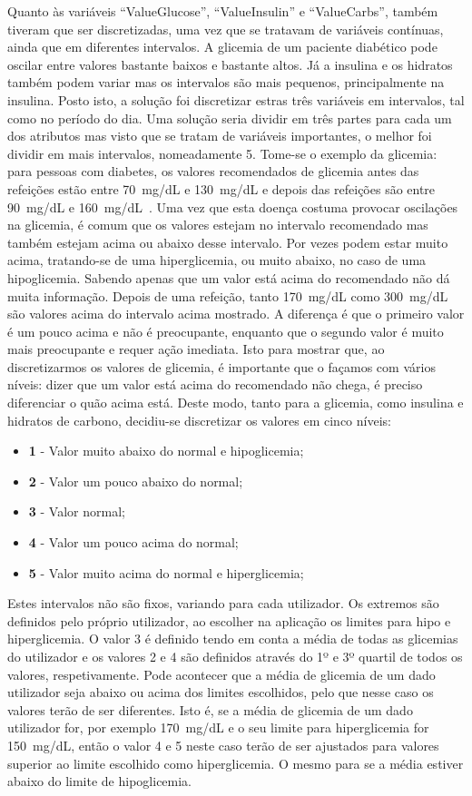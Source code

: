 Quanto às variáveis ``Value\textunderscore Glucose'', ``Value\textunderscore Insulin'' e ``Value\textunderscore Carbs'', também tiveram que ser discretizadas, uma vez que se tratavam de variáveis contínuas, ainda que em diferentes intervalos. A glicemia de um paciente diabético pode oscilar entre valores bastante baixos e bastante altos. Já a insulina e os hidratos também podem variar mas os intervalos são mais pequenos, principalmente na insulina. 
Posto isto, a solução foi discretizar estras três variáveis em intervalos, tal como no período do dia. 
Uma solução seria dividir em três partes para cada um dos atributos mas visto que se tratam de variáveis importantes, o melhor foi dividir em mais intervalos, nomeadamente 5.
Tome-se o exemplo da glicemia: para pessoas com diabetes, os valores recomendados de glicemia antes das refeições estão entre 70~mg/dL e 130~mg/dL e depois das refeições são entre 90~mg/dL e 160~mg/dL~\cite{levels}. Uma vez que esta doença costuma provocar oscilações na glicemia, é comum que os valores estejam no intervalo recomendado mas também estejam acima ou abaixo desse intervalo. Por vezes podem estar muito acima, tratando-se de uma hiperglicemia, ou muito abaixo, no caso de uma hipoglicemia. Sabendo apenas que um valor está acima do recomendado não dá muita informação. Depois de uma refeição, tanto 170~mg/dL como 300~mg/dL são valores acima do intervalo acima mostrado. A diferença é que o primeiro valor é um pouco acima e não é preocupante, enquanto que o segundo valor é muito mais preocupante e requer ação imediata. Isto para mostrar que, ao discretizarmos os valores de glicemia, é importante que o façamos com vários níveis: dizer que um valor está acima do recomendado não chega, é preciso diferenciar o quão acima está. Deste modo, tanto para a glicemia, como insulina e hidratos de carbono, decidiu-se discretizar os valores em cinco níveis:

\begin{itemize}
\item \textbf{1} - Valor muito abaixo do normal e hipoglicemia;
\item \textbf{2} - Valor um pouco abaixo do normal;
\item \textbf{3} - Valor normal;
\item \textbf{4} - Valor um pouco acima do normal;
\item \textbf{5} - Valor muito acima do normal e hiperglicemia;
\end{itemize}
Estes intervalos não são fixos, variando para cada utilizador. Os extremos são definidos pelo próprio utilizador, ao escolher na aplicação os limites para hipo e hiperglicemia. O valor 3 é definido tendo em conta a média de todas as glicemias do utilizador e os valores 2 e 4 são definidos através do 1º e 3º quartil de todos os valores, respetivamente. Pode acontecer que a média de glicemia de um dado utilizador seja abaixo ou acima dos limites escolhidos, pelo que nesse caso os valores terão de ser diferentes. Isto é, se a média de glicemia de um dado utilizador for, por exemplo 170~mg/dL e o seu limite para hiperglicemia for 150~mg/dL, então o valor 4 e 5 neste caso terão de ser ajustados para valores superior ao limite escolhido como hiperglicemia. O mesmo para se a média estiver abaixo do limite de hipoglicemia.

